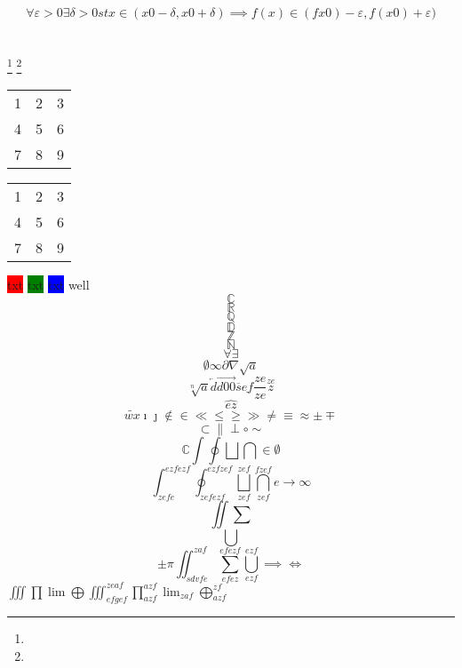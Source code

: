 \documentclass[a4paper]{article}
\title{}
\author{Paul \textsc{Dubois}}
\date{1st January 1970}
\begin{document}
\maketitle

$$\forall \varepsilon >0 \exists \delta >0 st x\in (x0-\delta ,x0+\delta ) \implies f(x)\in (fx0)-\varepsilon ,f(x0)+\varepsilon )$$
\section{} 
\subsection{}\section{} \section{} \section{} \footnote{} \footnote{} \marginpar{} 

\begin{tabular}{ l c r } %
   1 & 2 & 3 \\
   4 & 5 & 6 \\
   7 & 8 & 9 \\
\end{tabular}
\begin{tabular}{ l c r } %
   1 & 2 & 3 \\
   4 & 5 & 6 \\
   7 & 8 & 9 \\
\end{tabular}
\colorbox{red}{txt} 
\colorbox{green}{txt} 
\colorbox{blue}{txt} 
\color{red} 
well
   
\color{green} 
$$\mathbb{C} $$
\color{black} 
 $$\mathbb{R} $$
\color{blue} 
$$\mathbb{Q} $$
\color{darkgray} 
 $$\mathbb{D} $$
\color{yellow} 
$$\mathbb{Z} $$
\color{cyan} $$
\mathbb{N} $$
\color{magenta}
$$\forall \exists$$
\color{gray} 
 $$ \emptyset \infty \partial \nabla \sqrt{a} $$
\color{lightgray} 
$$\sqrt[n]{a} \overleftarrow{d} \overrightarrow{d00} \overline{s} \underline{ef} \frac{ze}{ze} \stackrel{ze}{z} $$
\color{white} 
$$\widehat{ez} $$
\color{lightgray} 
$$\widetilde{wx} \imath \jmath \not\in  \in  \ll \leq \geq \gg \neq \equiv \approx \pm \mp $$
\color{pink} 
$$\subset \parallel \perp \circ \sim $$
\color{brown} 
$$\mathbb{C} \int \oint \bigsqcup \bigcap \in \emptyset $$
\color{olive} 
$$\int_{zefe}^{ezfezf} \oint_{zefezf}^{ezfzef} \bigsqcup_{zef}^{zef} \bigcap_{zef}^{fzef} e \to \infty $$
\color{teal} 
$$\iint \sum $$
\color{orange} 
$$\bigcup $$
\color{purple} 
$$\pm \pi \iint_{sdvfe}^{zaf} \sum_{efez}^{efezf}  \bigcup_{ezf}^{ezf} \implies \iff $$
\color{lime} 
$\iiint \prod \lim \bigoplus \iiint_{efgef}^{zeaf} \prod_{azf}^{azf} \lim_{zaf} \bigoplus_{azf}^{zf} $
\end{document}
